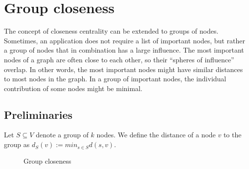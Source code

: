 \chapter{Group closeness}
\label{ch:groupCloseness}

The concept of closeness centrality can be extended to groups of nodes. Sometimes, an application does not require a list of important nodes, but rather a group of nodes that in combination has a large influence. The most important nodes of a graph are often close to each other, so their ``spheres of influence'' overlap. In other words, the most important nodes might have similar distances to most nodes in the graph. In a group of important nodes, the individual contribution of some nodes might be minimal.



\section{Preliminaries}
Let $S \subseteq V$ denote a group of $k$ nodes. We define the distance of a node $v$ to the group as $d_S(v) := min_{s \in S}d(s, v)$. 

\begin{figure}[h!]
\centering
{}
\caption{Group closeness}{}
\label{fig:groupCloseness}
\end{figure}